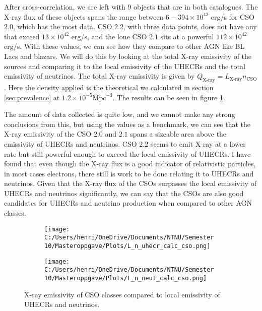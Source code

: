 After cross-correlation, we are left with $9$ objects that are in both catalogues. The X-ray flux of these objects spans the range between $6-394 \times 10^{42}$ erg/s for CSO $2.0$, which has the most data. CSO 2.2, with three data points, does not have any that exceed $13 \times 10^{42}$ erg/s, and the lone CSO $2.1$ sits at a powerful $112 \times 10^{42}$ erg/s. With these values, we can see how they compare to other AGN like BL Lacs and blazars. We will do this by looking at the total X-ray emissivity of the sources and comparing it to the local emissivity of the UHECRs and the total emissivity of neutrinos. The total X-ray emissivity is given by $Q_{\text{X-ray}} = L_{\text{X-ray}} n_{\text{CSO}}$. Here the density applied is the theoretical we calculated in section \ref{sec:prevalence} at $1.2 \times 10^{-5} $$\text{Mpc}^{-3}$. The results can be seen in figure \ref{fig:X-ray_em}. 

The amount of data collected is quite low, and we cannot make any strong conclusions from this, but using the values as a benchmark, we can see that the X-ray emissivity of the CSO $2.0$ and $2.1$ spans a sizeable area above the emissivity of UHECRs and neutrinos. CSO $2.2$ seems to emit X-ray at a lower rate but still powerful enough to exceed the local emissivity of UHECRs. I have found that even though the X-ray flux is a good indicator of relativistic particles, in most cases electrons, there still is work to be done relating it to UHECRs and neutrinos. Given that the X-ray flux of the CSOs surpasses the local emissivity of UHECRs and neutrinos significantly, we can say that the CSOs are also good candidates for UHECRs and neutrino production when compared to other AGN classes.



\begin{figure}[H]
    
    \centering
    \begin{subfigure}[b]{0.49\textwidth}
        \centering
        \texttt{[image: C:/Users/henri/OneDrive/Documents/NTNU/Semester 10/Masteroppgave/Plots/L\_n\_uhecr\_calc\_cso.png]}
       
    \end{subfigure}
    \hfill
    \begin{subfigure}[b]{0.49\textwidth}
        \centering
        \texttt{[image: C:/Users/henri/OneDrive/Documents/NTNU/Semester 10/Masteroppgave/Plots/L\_n\_neut\_calc\_cso.png]}
    \end{subfigure}
    \caption{X-ray emissivity of CSO classes compared to local emissivity of UHECRs and neutrinos.}
    \label{fig:X-ray_em}
\end{figure}


